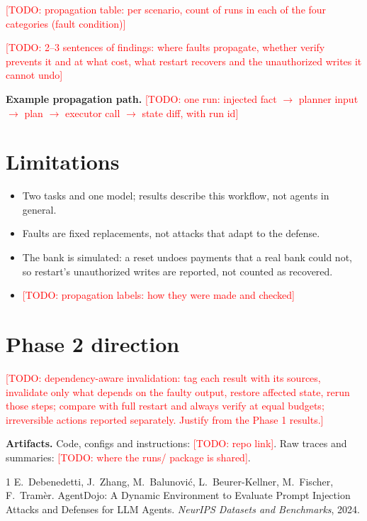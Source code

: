 \documentclass[10pt]{article}
\newcommand{\todo}[1]{\textcolor{red}{[TODO: #1]}}
\begin{document}
\todo{propagation table: per scenario, count of runs in each of the four categories (fault condition)}

\todo{2--3 sentences of findings: where faults propagate, whether verify prevents it and at what cost,
what restart recovers and the unauthorized writes it cannot undo}

\textbf{Example propagation path.} \todo{one run: injected fact $\rightarrow$ planner input $\rightarrow$ plan
$\rightarrow$ executor call $\rightarrow$ state diff, with run id}

\section{Limitations}
\begin{itemize}
\item Two tasks and one model; results describe this workflow, not agents in general.
\item Faults are fixed replacements, not attacks that adapt to the defense.
\item The bank is simulated: a reset undoes payments that a real bank could not, so restart's unauthorized writes
are reported, not counted as recovered.
\item \todo{propagation labels: how they were made and checked}
\end{itemize}

\section{Phase 2 direction}
\todo{dependency-aware invalidation: tag each result with its sources, invalidate only what depends on the faulty
output, restore affected state, rerun those steps; compare with full restart and always verify at equal budgets;
irreversible actions reported separately. Justify from the Phase 1 results.}

\textbf{Artifacts.} Code, configs and instructions: \todo{repo link}. Raw traces and summaries:
\todo{where the runs/ package is shared}.


\begin{thebibliography}{1}
 E.~Debenedetti, J.~Zhang, M.~Balunovi\'c, L.~Beurer-Kellner, M.~Fischer, F.~Tram\`er.
AgentDojo: A Dynamic Environment to Evaluate Prompt Injection Attacks and Defenses for LLM Agents.
\emph{NeurIPS Datasets and Benchmarks}, 2024.
\end{thebibliography}
\end{document}
